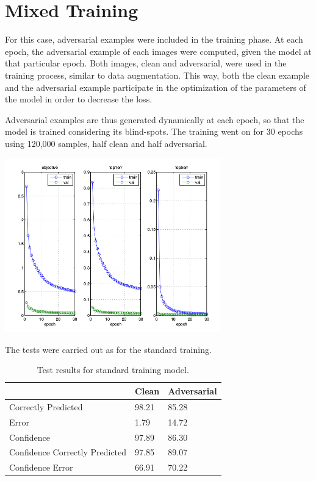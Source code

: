 \section{Mixed Training}

For this case, adversarial examples were included in the training phase. At each epoch, the adversarial example of each images were computed, given the model at that particular epoch. Both images, clean and adversarial, were used in the training process, similar to data augmentation. This way, both the clean example and the adversarial example participate in the optimization of the parameters of the model in order to decrease the loss.

Adversarial examples are thus generated dynamically at each epoch, so that the model is trained considering its blind-spots.
The training went on for 30 epochs using 120,000 samples, half clean and half adversarial.

\begin{center}
  \includegraphics[width=0.7\textwidth]{img/train-mix.png}
	\label{train-mix} 
\end{center}

The tests were carried out as for the standard training.

\FloatBarrier
\begin{table}[h]
\centering
\begin{tabular}{@{}lll@{}}
\toprule
                               & Clean & Adversarial \\ \midrule
Correctly Predicted            & 98.21 & 85.28       \\
Error                          & 1.79  & 14.72       \\
Confidence                     & 97.89 & 86.30       \\
Confidence Correctly Predicted & 97.85 & 89.07       \\
Confidence Error               & 66.91 & 70.22       \\ \bottomrule
\end{tabular}
\caption{Test results for standard training model.}
\label{mixed-test}
\end{table}
\FloatBarrier

